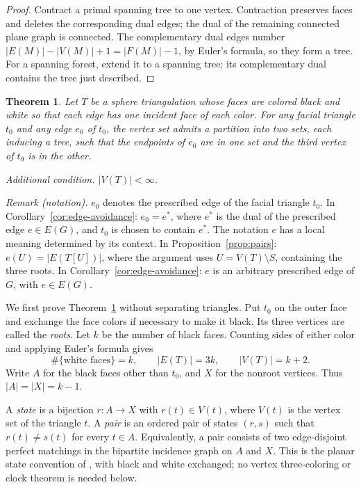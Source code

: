 \documentclass[11pt]{article}
\newtheorem{theorem}{Theorem}[section]
\theoremstyle{remark}
\newcommand{\abs}[1]{\left|#1\right|}
\numberwithin{equation}{section}
\begin{document}
\begin{proof}
Contract a primal spanning tree to one vertex. Contraction
preserves faces and deletes the corresponding dual edges; the
dual of the remaining connected plane graph is connected.
The complementary dual edges number
\(\abs{E(M)}-\abs{V(M)}+1=\abs{F(M)}-1\), by Euler's formula,
so they form a tree. For a spanning forest, extend it to a
spanning tree; its complementary dual contains the tree just
described.
\end{proof}

\begin{theorem}\label{thm:partition}
Let \(T\) be a sphere triangulation whose faces are colored black
and white so that each edge has one incident face of each color.
For any facial triangle \(t_0\) and any edge \(e_0\) of \(t_0\),
the vertex set admits a partition into two sets, each inducing
a tree, such that the endpoints of \(e_0\) are in one set and
the third vertex of \(t_0\) is in the other.

\emph{Additional condition.} $\abs{V(T)}<\infty$.
\end{theorem}

\noindent\textit{Remark (notation).} $e_0$ denotes the prescribed edge of the facial triangle $t_0$. In Corollary~\ref{cor:edge-avoidance}: $e_0=e^*$, where $e^*$ is the dual of the prescribed edge $e\in E(G)$, and $t_0$ is chosen to contain $e^*$. The notation $e$ has a local meaning determined by its context. In Proposition~\ref{prop:pairs}: $e(U)=\abs{E(T[U])}$, where the argument uses $U=V(T)\setminus S$, containing the three roots. In Corollary~\ref{cor:edge-avoidance}: $e$ is an arbitrary prescribed edge of $G$, with $e\in E(G)$.


We first prove Theorem~\ref{thm:partition} without separating
triangles. Put \(t_0\) on the outer face and exchange the face
colors if necessary to make it black. Its three vertices are
called the \emph{roots}. Let \(k\) be the number of black faces.
Counting sides of either color and applying Euler's formula gives
\begin{equation}\label{eq:counts}
 \#\{\text{white faces}\}=k,\qquad
 \abs{E(T)}=3k,\qquad \abs{V(T)}=k+2.
\end{equation}
Write \(A\) for the black faces other than \(t_0\), and \(X\)
for the nonroot vertices. Thus \(\abs{A}=\abs{X}=k-1\).

A \emph{state} is a bijection \(r:A\longrightarrow X\) with
\(r(t)\in V(t)\), where \(V(t)\) is the vertex set of the
triangle \(t\). A \emph{pair} is an ordered pair of states
\((r,s)\) such that \(r(t)\ne s(t)\) for every \(t\in A\).
Equivalently, a pair consists of two edge-disjoint perfect
matchings in the bipartite incidence graph on \(A\) and \(X\).
This is the planar state convention of \citet[Section~1]{HK2018},
with black and white exchanged; no vertex three-coloring or clock
theorem is needed below.
\end{document}
